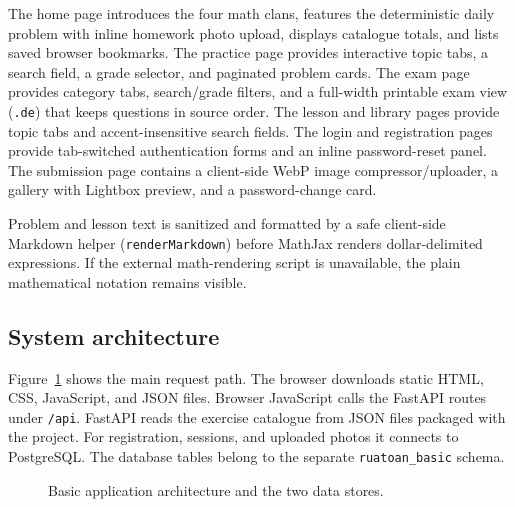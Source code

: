The home page introduces the four math clans, features the deterministic daily problem with inline homework photo upload, displays catalogue totals, and lists saved browser bookmarks. The practice page provides interactive topic tabs, a search field, a grade selector, and paginated problem cards. The exam page provides category tabs, search/grade filters, and a full-width printable exam view (\texttt{.de}) that keeps questions in source order. The lesson and library pages provide topic tabs and accent-insensitive search fields. The login and registration pages provide tab-switched authentication forms and an inline password-reset panel. The submission page contains a client-side WebP image compressor/uploader, a gallery with Lightbox preview, and a password-change card.

Problem and lesson text is sanitized and formatted by a safe client-side Markdown helper (\texttt{renderMarkdown}) before MathJax renders dollar-delimited expressions. If the external math-rendering script is unavailable, the plain mathematical notation remains visible.

\subsection{System architecture}
Figure~\ref{fig:basic-architecture} shows the main request path. The browser downloads static HTML, CSS, JavaScript, and JSON files. Browser JavaScript calls the FastAPI routes under \texttt{/api}. FastAPI reads the exercise catalogue from JSON files packaged with the project. For registration, sessions, and uploaded photos it connects to PostgreSQL. The database tables belong to the separate \texttt{ruatoan\_basic} schema.
\begin{figure}[ht]
\centering
{}
\caption{Basic application architecture and the two data stores.}
\label{fig:basic-architecture}
\end{figure}

